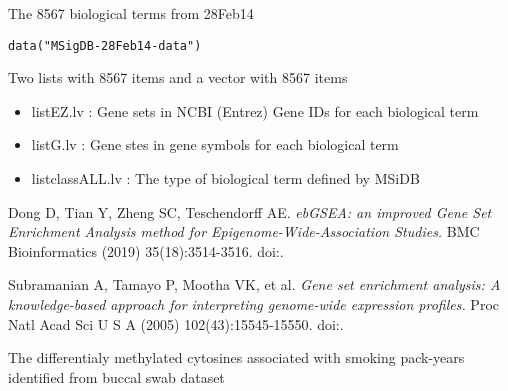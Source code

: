 \documentclass[letterpaper]{book}
\begin{document}
%
\begin{Description}\relax
The 8567 biological terms from  28Feb14
\end{Description}
%
\begin{Usage}
\begin{verbatim}
data("MSigDB-28Feb14-data")
\end{verbatim}
\end{Usage}
%
\begin{Format}
Two lists with 8567 items and a vector with 8567 items
\end{Format}
%
\begin{Details}\relax
\begin{itemize}

\item{} listEZ.lv : Gene sets in NCBI (Entrez) Gene IDs for each biological term
\item{} listG.lv : Gene stes in gene symbols for each biological term
\item{} listclassALL.lv : The type of biological term defined by MSiDB

\end{itemize}

\end{Details}
%
\begin{References}\relax
Dong D, Tian Y, Zheng SC, Teschendorff AE.
\emph{ebGSEA: an improved Gene Set Enrichment Analysis method for Epigenome-Wide-Association Studies.}
BMC Bioinformatics (2019) 35(18):3514-3516.
doi:.

Subramanian A, Tamayo P, Mootha VK, et al.
\emph{Gene set enrichment analysis: A knowledge-based approach for interpreting genome-wide expression profiles.}
Proc Natl Acad Sci U S A (2005) 102(43):15545‐15550.
doi:.
\end{References}
%
\begin{Description}\relax
The differentialy methylated cytosines associated with smoking pack-years identified from buccal swab dataset
\end{Description}
\end{document}
